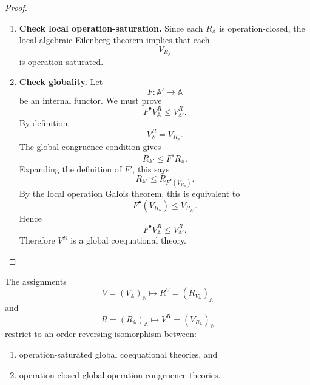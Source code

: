 \begin{proof}
    \leavevmode
    \begin{enumerate}
        \item \textbf{Check local operation-saturation.}
        Since each \(R_{\mathbb A}\) is operation-closed, the local algebraic
        Eilenberg theorem implies that each
        \[
            V_{R_{\mathbb A}}
        \]
        is operation-saturated.

        \item \textbf{Check globality.}
        Let
        \[
            F:\mathbb A'\to\mathbb A
        \]
        be an internal functor. We must prove
        \[
            F^\bullet V^R_{\mathbb A}\leq V^R_{\mathbb A'}.
        \]
        By definition,
        \[
            V^R_{\mathbb A}=V_{R_{\mathbb A}}.
        \]
        The global congruence condition gives
        \[
            R_{\mathbb A'}\leq F^\flat R_{\mathbb A}.
        \]
        Expanding the definition of \(F^\flat\), this says
        \[
            R_{\mathbb A'}
            \leq
            R_{F^\bullet(V_{R_{\mathbb A}})}.
        \]
        By the local operation Galois theorem, this is equivalent to
        \[
            F^\bullet(V_{R_{\mathbb A}})
            \leq
            V_{R_{\mathbb A'}}.
        \]
        Hence
        \[
            F^\bullet V^R_{\mathbb A}\leq V^R_{\mathbb A'}.
        \]
        Therefore \(V^R\) is a global coequational theory.
    \end{enumerate}
\end{proof}

\begin{theorem}
\label{thm:global-algebraic-eilenberg}
    The assignments
    \[
        V=(V_{\mathbb A})_{\mathbb A}
        \longmapsto
        R^V=(R_{V_{\mathbb A}})_{\mathbb A}
    \]
    and
    \[
        R=(R_{\mathbb A})_{\mathbb A}
        \longmapsto
        V^R=(V_{R_{\mathbb A}})_{\mathbb A}
    \]
    restrict to an order-reversing isomorphism between:
    \begin{enumerate}
        \item operation-saturated global coequational theories, and
        \item operation-closed global operation congruence theories.
    \end{enumerate}
\end{theorem}

